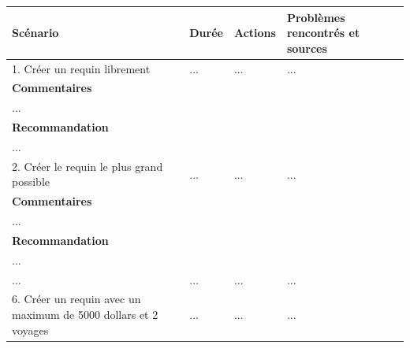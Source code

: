 \documentclass{article}
\begin{document}
\begin{table}[h]
	\centering
	\begin{tabular}{|p{6cm}|p{1.5cm}|p{1.5cm}|p{2.5cm}|}
		\hline
		\textbf{Scénario}                                               & \textbf{Durée} & \textbf{Actions} & \textbf{Problèmes rencontrés et sources} \\ \hline
		1. Créer un requin librement                                    & ...            & ...              & ...                                      \\ \hline
		\multicolumn{4}{|p{14cm}|}{\textbf{Commentaires}}                                                                                              \\ \hline
		\multicolumn{4}{|p{14cm}|}{...}                                                                                                                \\ \hline
		\multicolumn{4}{|p{14cm}|}{\textbf{Recommandation}}                                                                                            \\ \hline
		\multicolumn{4}{|p{14cm}|}{...}                                                                                                                \\ \hline
		2. Créer le requin le plus grand possible                       & ...            & ...              & ...                                      \\ \hline
		\multicolumn{4}{|p{14cm}|}{\textbf{Commentaires}}                                                                                              \\ \hline
		\multicolumn{4}{|p{14cm}|}{...}                                                                                                                \\ \hline
		\multicolumn{4}{|p{14cm}|}{\textbf{Recommandation}}                                                                                            \\ \hline
		\multicolumn{4}{|p{14cm}|}{...}                                                                                                                \\ \hline
		...                                                             & ...            & ...              & ...                                      \\ \hline
		6. Créer un requin avec un maximum de 5000 dollars et 2 voyages & ...            & ...              & ...                                      \\ \hline

\end{tabular}
\end{table}
\end{document}
